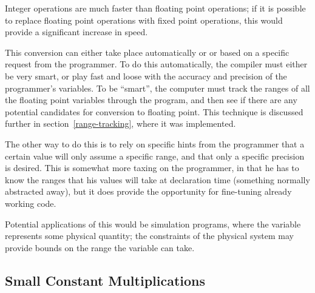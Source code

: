 Integer operations are much faster than floating point operations; if it is
possible to replace floating point operations with fixed point operations,
this would provide a significant increase in speed.

This conversion can either take place automatically or or based on a
specific request from the programmer.  To do this automatically, the
compiler must either be very smart, or play fast and loose with the accuracy
and precision of the programmer's variables.  To be ``smart'', the computer
must track the ranges of all the floating point variables through the
program, and then see if there are any potential candidates for conversion
to floating point.  This technique is discussed further in
section~\ref{range-tracking}, where it was implemented.

The other way to do this is to rely on specific hints from the programmer
that a certain value will only assume a specific range, and that only a
specific precision is desired.  This is somewhat more taxing on the
programmer, in that he has to know the ranges that his values will take at
declaration time (something normally abstracted away), but it does provide
the opportunity for fine-tuning already working code.

Potential applications of this would be simulation programs, where the
variable represents some physical quantity; the constraints of the physical
system may provide bounds on the range the variable can take.
\subsection{Small Constant Multiplications}


